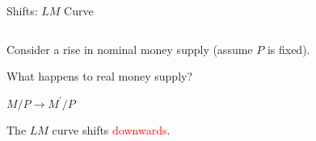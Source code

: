 \documentclass[shownotes,11pt, aspectratio=169]{beamer}
\newenvironment{wideitemize}{\itemize\addtolength{\itemsep}{10pt}}{\enditemize}
\begin{document}
\begin{frame}{Shifts: $LM$ Curve}
\begin{columns}[T] %
\begin{column}{.44\textwidth}
  \begin{wideitemize}
   \item Consider a rise in nominal money supply (assume $P$ is fixed).
   \item What happens to real money supply? \pause 
   \item $M/P \rightarrow M^{\prime}/P $ \pause
   \item The $LM$ curve shifts \pause \textcolor{red}{downwards}.
  \end{wideitemize}
\end{column}%
\pause
\hfill%
\begin{column}{.53\textwidth}
\end{column}%
\end{columns}
\end{frame}
\end{document}
